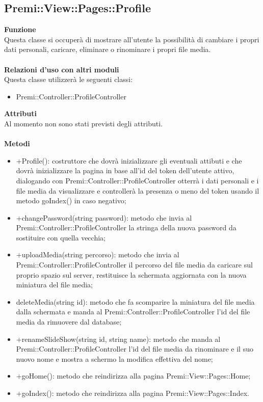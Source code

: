{					\subsection{Premi::View::Pages::Profile}{
						\textbf{Funzione}\\
						\indent Questa classe si occuperà di mostrare all'utente la possibilità di cambiare i propri dati personali, caricare, eliminare o rinominare i propri file media.\\\\
						\textbf{Relazioni d'uso con altri moduli}\\
						\indent Questa classe utilizzerà le seguenti classi:
						\begin{itemize}
							\item Premi::Controller::ProfileController
						\end{itemize}
						\textbf{Attributi}\\
						\indent Al momento non sono stati previsti degli attributi.\\\\
						\textbf{Metodi}
						\begin{itemize}
							\item +Profile(): costruttore che dovrà inizializzare gli eventuali attibuti e che dovrà inizializzare la pagina in base all'id del token dell'utente attivo, dialogando con Premi::Controller::ProfileController otterrà i dati personali e i file media da visualizzare e controllerà la presenza o meno del token usando il metodo goIndex() in caso negativo;
							\item +changePassword(string password): metodo che invia al Premi::Controller::ProfileController la stringa della nuova password da sostituire con quella vecchia;
							\item +uploadMedia(string percorso): metodo che invia al Premi::Controller::ProfileController il percorso del file media da caricare sul proprio spazio sul server, restituisce la schermata aggiornata con la nuova miniatura del file media;
							\item deleteMedia(string id): metodo che fa scomparire la miniatura del file media dalla schermata e manda al Premi::Controller::ProfileController l'id del file media da rimuovere dal database;
							\item +renameSlideShow(string id, string name): metodo che manda al Premi::Controller::ProfileController l'id del file media da rinominare e il suo nuovo nome e mostra a schermo la modifica effettiva del nome;
							\item +goHome(): metodo che reindirizza alla pagina Premi::View::Pages::Home;
							\item +goIndex(): metodo che reindirizza alla pagina Premi::View::Pages::Index.
						\end{itemize}
					}
}
